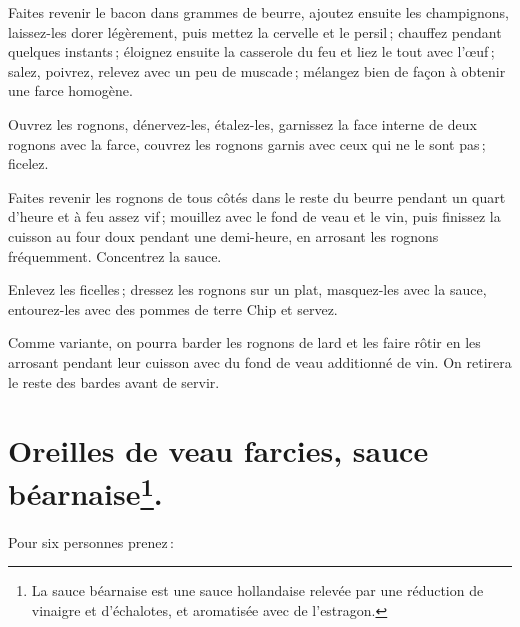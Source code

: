 Faites revenir le bacon dans {\mmm} grammes de beurre, ajoutez ensuite les
champignons, laissez-les dorer légèrement, puis mettez la cervelle et le
persil ; chauffez pendant quelques instants ; éloignez ensuite la casserole du
feu et liez le tout avec l'œuf ; salez, poivrez, relevez avec un peu de
muscade ; mélangez bien de façon à obtenir une farce homogène.

Ouvrez les rognons, dénervez-les, étalez-les, garnissez la face interne de deux
rognons avec la farce, couvrez les rognons garnis avec ceux qui ne le sont pas ;
ficelez.

Faites revenir les rognons de tous côtés dans le reste du beurre pendant un
quart d'heure et à feu assez vif ; mouillez avec le fond de veau et le vin, puis
finissez la cuisson au four doux pendant une demi-heure, en arrosant les rognons
fréquemment. Concentrez la sauce.

Enlevez les ficelles ; dressez les rognons sur un plat, masquez-les avec la
sauce, entourez-les avec des pommes de terre Chip et servez.

\sk

Comme variante, on pourra barder les rognons de lard et les faire rôtir en les
arrosant pendant leur cuisson avec du fond de veau additionné de vin. On
retirera le reste des bardes avant de servir.

\section*{\centering Oreilles de veau farcies, sauce béarnaise\footnote{La
sauce béarnaise est une sauce hollandaise relevée par une réduction de vinaigre
et d'échalotes, et aromatisée avec de l'estragon.}.}

{}
\label{pg0433} \hypertarget{p0433}{}

Pour six personnes prenez :

\medskip

